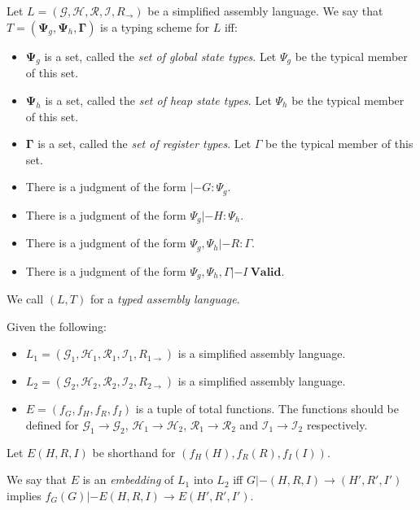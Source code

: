\begin{definition}
  Let $L = (\mathcal{G}, \mathcal{H}, \mathcal{R}, \mathcal{I}, R_\to)$ be a
  simplified assembly language. We say that
  $T = (\mathbf{\Psi}_g, \mathbf{\Psi}_h, \mathbf{\Gamma})$ is a typing scheme
  for $L$ iff:

  \begin{itemize}
  \item $\mathbf{\Psi}_g$ is a set, called the \emph{set of global state
      types}. Let $\Psi_g$ be the typical member of this set.
  \item $\mathbf{\Psi}_h$ is a set, called the \emph{set of heap state
      types}. Let $\Psi_h$ be the typical member of this set.
  \item $\mathbf{\Gamma}$ is a set, called the \emph{set of register types}. Let
    $\Gamma$ be the typical member of this set.
  \item There is a judgment of the form $|- G : \Psi_g$.
  \item There is a judgment of the form $\Psi_g |- H : \Psi_h$.
  \item There is a judgment of the form $\Psi_g , \Psi_h |- R : \Gamma$.
  \item There is a judgment of the form $\Psi_g , \Psi_h , \Gamma |- I\ \mathbf{Valid}$.
  \end{itemize}

  We call $(L, T)$ for a \emph{typed assembly language}.
\end{definition}

\begin{definition}
  Given the following:
  \begin{itemize}
  \item
    $L_1 = (\mathcal{G}_1, \mathcal{H}_1, \mathcal{R}_1, \mathcal{I}_1,
    R_{1\to})$ is a simplified assembly language.

  \item
    $L_2 = (\mathcal{G}_2, \mathcal{H}_2, \mathcal{R}_2, \mathcal{I}_2,
    R_{2\to})$ is a simplified assembly language.

  \item $E = (f_G, f_H, f_R, f_I)$ is a tuple of total functions. The functions
    should be defined for $\mathcal{G}_1 \to \mathcal{G}_2$,
    $\mathcal{H}_1 \to \mathcal{H}_2$, $\mathcal{R}_1 \to \mathcal{R}_2$ and
    $\mathcal{I}_1 \to \mathcal{I}_2$ respectively.
  \end{itemize}

  Let $E(H, R, I)$ be shorthand for $(f_H(H), f_R(R), f_I(I))$.

  We say that $E$ is an \emph{embedding} of $L_1$ into $L_2$ iff
  $G |- (H, R, I) \to (H', R', I')$ implies
  $f_G(G) |- E(H, R, I) \to E(H', R', I')$.
\end{definition}


